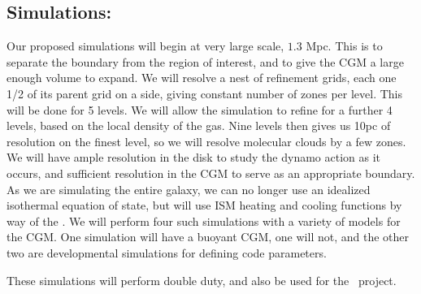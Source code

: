 \subsection{Simulations: \nameGalaxies}
\label{subsec.galaxies_sims}

Our proposed simulations will begin at very large scale, $1.3$ Mpc.  This is to
separate the boundary from the region of interest, and to give the CGM a large
enough volume to expand.  We will resolve a nest of refinement grids, each one
1/2 of its parent grid on a side, giving constant number of zones per level.
This will be done for 5 levels.  We will allow the simulation to 
refine for a further 4 levels, based on the local density of the gas.  Nine
levels then gives us 10pc of resolution on the finest
level, so we will resolve molecular clouds by a few zones.  We will have ample
resolution in the disk to study the dynamo action as it occurs, and sufficient
resolution in the CGM to serve as an appropriate boundary.  As we are simulating
the entire galaxy, we can no longer use an idealized isothermal equation of
state, but will use ISM heating and cooling functions by way of the
.  We will perform four such simulations with a variety of models
for the CGM.  One simulation will have a buoyant CGM, one will not, and the
other two are developmental simulations for defining code parameters.

These simulations will perform double duty, and also be used for the \nameCMB\
project.
